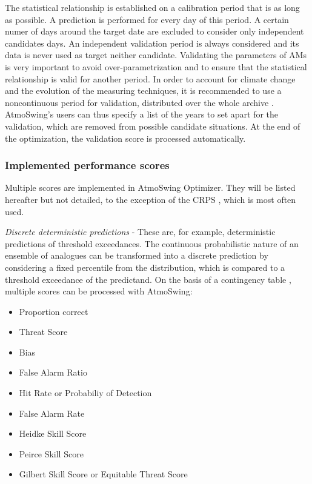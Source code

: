 \documentclass[review]{elsarticle}
\begin{document}
The statistical relationship is established on a calibration period that is as long as possible. A prediction is performed for every day of this period. A certain numer of days around the target date are excluded to consider only independent candidates days. An independent validation period is always considered and its data is never used as target neither candidate. Validating the parameters of AMs is very important to avoid over-parametrization and to ensure that the statistical relationship is valid for another period. In order to account for climate change and the evolution of the measuring techniques, it is recommended to use a noncontinuous period for validation, distributed over the whole archive \citep{BenDaoud2010, Horton2018b}. AtmoSwing's users can thus specify a list of the years to set apart for the validation, which are removed from possible candidate situations. At the end of the optimization, the validation score is processed automatically.


\subsubsection{Implemented performance scores}
\label{sec:scores}

Multiple scores are implemented in AtmoSwing Optimizer. They will be listed hereafter but not detailed, to the exception of the CRPS \citep[Continuous Ranked Probability Score,][]{Brown1974, Matheson1976, Hersbach2000}, which is most often used. 


\textit{Discrete deterministic predictions} - These are, for example, deterministic predictions of threshold exceedances. The continuous probabilistic nature of an ensemble of analogues can be transformed into a discrete prediction by considering a fixed percentile from the distribution, which is compared to a threshold exceedance of the predictand. On the basis of a contingency table \citep{Wilks2006}, multiple scores can be processed with AtmoSwing:

\begin{itemize}
	\item Proportion correct \citep{Finley1884}
	\item Threat Score \citep{Gilbert1884}
	\item Bias
	\item False Alarm Ratio
	\item Hit Rate or Probabiliy of Detection
	\item False Alarm Rate
	\item Heidke Skill Score \citep{Heidke1926}
	\item Peirce Skill Score \citep{Peirce1884}
	\item Gilbert Skill Score or Equitable Threat Score \citep{Gilbert1884}
\end{itemize}
\end{document}

